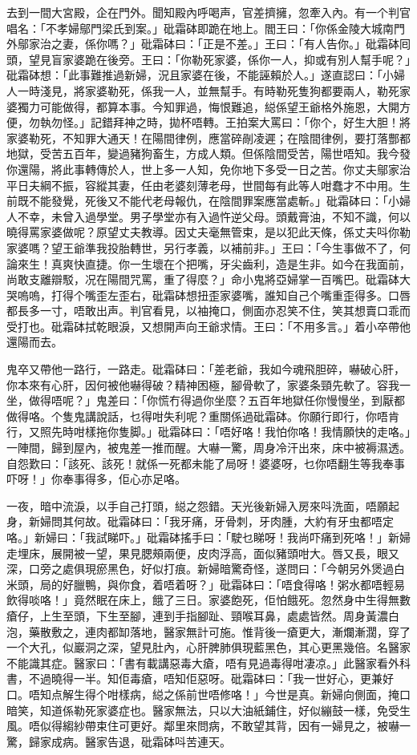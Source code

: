 \documentclass[a5paper, 12pt, openany]{book} %
\begin{document}
	去到一間大宮殿，企在門外。聞知殿內呼喝声，官差擠擁，忽牽入內。有一个判官唱名：「不孝婦鄔門梁氏到案。」砒霜砵即跪在地上。閻王曰：「你係金陵大城南門外鄔家治之妻，係你嗎？」砒霜砵曰：「正是不差。」王曰：「有人告你。」砒霜砵囘頭，望見盲家婆跪在後旁。王曰：「你勒死家婆，係你一人，抑或有別人幫手呢？」砒霜砵想：「此事難推過新婦，況且家婆在後，不能誣賴於人。」遂直認曰：「小婦人一時淺見，將家婆勒死，係我一人，並無幫手。有時勒死隻狗都要兩人，勒死家婆獨力可能做得，都算本事。今知罪過，悔恨難追，縂係望王爺格外施恩，大開方便，勿執勿怪。」記錯拜神之時，拋杯唔轉。王拍案大罵曰：「你个，好生大胆！將家婆勒死，不知罪大通天！在陽間律例，應當碎剮凌遲；在陰間律例，要打落酆都地獄，受苦五百年，變過豬狗畜生，方成人類。但係陰間受苦，陽世唔知。我今發你還陽，將此事轉傳於人，世上多一人知，免你地下多受一日之苦。你丈夫鄔家治平日夫綱不振，容縱其妻，任由老婆刻薄老母，世間每有此等人咁蠢才不中用。生前既不能發覺，死後又不能代老母報仇，在陰間罪案應當處斬。」砒霜砵曰：「小婦人不幸，未曾入過學堂。男子學堂亦有入過忤逆父母。頭戴膏油，不知不識，何以曉得罵家婆做呢？原望丈夫教導。因丈夫毫無管束，是以犯此天條，係丈夫呌你勒家婆嗎？望王爺準我投胎轉世，另行孝義，以補前非。」王曰：「今生事做不了，何論來生！真爽快直捷。你一生壞在个把嘴，牙尖齒利，造是生非。如今在我面前，尚敢支離辯駁，况在陽間咒罵，重了得麼？」命小鬼將亞婦掌一百嘴巴。砒霜砵大哭嗚嗚，打得个嘴歪左歪右，砒霜砵想扭歪家婆嘴，誰知自己个嘴重歪得多。口唇都長多一寸，唔敢出声。判官看見，以袖掩口，側面亦忍笑不住，笑其想賣口乖而受打也。砒霜砵拭乾眼淚，又想開声向王爺求情。王曰：「不用多言。」着小卒帶他還陽而去。

	鬼卒又帶他一路行，一路走。砒霜砵曰：「差老爺，我如今魂飛胆碎，嚇破心肝，你本來有心肝，因何被他嚇得破？精神困極，腳骨軟了，家婆条頸先軟了。容我一坐，做得唔呢？」鬼差曰：「你慌冇得過你坐麼？五百年地獄任你慢慢坐，到厭都做得咯。个隻鬼講說話，乜得咁失利呢？重關係過砒霜砵。你願行即行，你唔肯行，又照先時咁樣拖你隻脚。」砒霜砵曰：「唔好咯！我怕你咯！我情願快的走咯。」一陣間，歸到屋內，被鬼差一推而醒。大嚇一驚，周身冷汗出來，床中被褥濕透。自怨歎曰：「該死、該死！就係一死都未能了局呀！婆婆呀，乜你唔翻生等我奉事吓呀！」你奉事得多，佢心亦足咯。

	一夜，暗中流淚，以手自己打頭，縂之怨錯。天光後新婦入房來呌洗面，唔願起身，新婦問其何故。砒霜砵曰：「我牙痛，牙骨刺，牙肉腫，大約有牙虫都唔定咯。」新婦曰：「我試睇吓。」砒霜砵搖手曰：「駛乜睇呀！我尚吓痛到死咯！」新婦走埋床，展開被一望，果見腮頰兩便，皮肉浮高，面似豬頭咁大。唇又長，眼又深，口旁之處俱現瘀黑色，好似打痕。新婦暗驚奇怪，遂問曰：「今朝另外煲過白米頭，局的好臘鴨，與你食，着唔着呀？」砒霜砵曰：「唔食得咯！粥水都唔輕易飲得啖咯！」竟然眠在床上，餓了三日。家婆飽死，佢怕餓死。忽然身中生得無數瘡仔，上生至頭，下生至腳，連到手指腳趾、頸喉耳鼻，處處皆然。周身黃濃白泡，藥散敷之，連肉都缷落地，醫家無計可施。惟背後一瘡更大，漸爛漸濶，穿了一个大孔，似巖洞之深，望見肚內，心肝脾肺俱現藍黑色，其心更黑幾倍。名醫家不能識其症。醫家曰：「書有載講惡毒大瘡，唔有見過毒得咁凄凉。」此醫家看外科書，不過曉得一半。知佢毒瘡，唔知佢惡呀。砒霜砵曰：「我一世好心，更兼好口。唔知点解生得个咁樣病，縂之係前世唔修咯！」今世是真。新婦向側面，掩口暗笑，知道係勒死家婆症也。醫家無法，只以大油紙鋪住，好似繃鼓一樣，免受生風。唔似得縐紗帶束住可更好。鄰里來問病，不敢望其背，因有一婦見之，被嚇一驚，歸家成病。醫家告退，砒霜砵呌苦連天。
\end{document}

